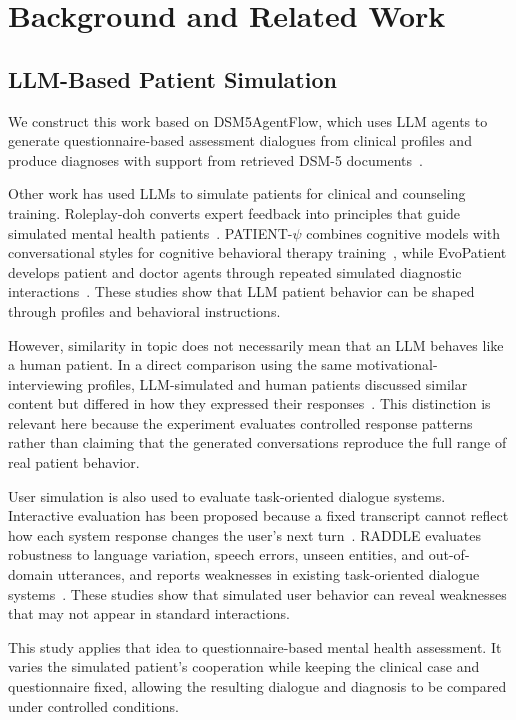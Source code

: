 \section{Background and Related Work}\label{s:background}

\subsection{LLM-Based Patient Simulation}

We construct this work based on DSM5AgentFlow, which uses LLM agents to generate questionnaire-based assessment dialogues from clinical profiles and produce diagnoses with support from retrieved DSM-5 documents~\cite{ozgun2025trustworthyaipsychotherapymultiagent}.

Other work has used LLMs to simulate patients for clinical and counseling training. Roleplay-doh converts expert feedback into principles that guide simulated mental health patients~\cite{louie2024roleplaydoh}. PATIENT-$\psi$ combines cognitive models with conversational styles for cognitive behavioral therapy training~\cite{wang2024patientpsi}, while EvoPatient develops patient and doctor agents through repeated simulated diagnostic interactions~\cite{du2025evopatient}. These studies show that LLM patient behavior can be shaped through profiles and behavioral instructions.

However, similarity in topic does not necessarily mean that an LLM behaves like a human patient. In a direct comparison using the same motivational-interviewing profiles, LLM-simulated and human patients discussed similar content but differed in how they expressed their responses~\cite{hoang2026standardised}. This distinction is relevant here because the experiment evaluates controlled response patterns rather than claiming that the generated conversations reproduce the full range of real patient behavior.

User simulation is also used to evaluate task-oriented dialogue systems. Interactive evaluation has been proposed because a fixed transcript cannot reflect how each system response changes the user's next turn~\cite{cheng2022interactive}. RADDLE evaluates robustness to language variation, speech errors, unseen entities, and out-of-domain utterances, and reports weaknesses in existing task-oriented dialogue systems~\cite{peng2021raddle}. These studies show that simulated user behavior can reveal weaknesses that may not appear in standard interactions.

This study applies that idea to questionnaire-based mental health assessment. It varies the simulated patient's cooperation while keeping the clinical case and questionnaire fixed, allowing the resulting dialogue and diagnosis to be compared under controlled conditions.

